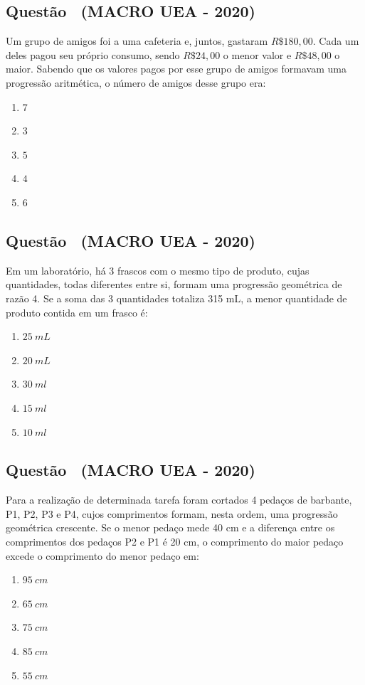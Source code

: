 \documentclass[12pt]{article}
\newcounter{questao}
\newcommand{\novaquestao}[1]{%
  \stepcounter{questao}%
  \subsection*{Questão \thequestao\ (#1)}%
}
\begin{document}
\begin{multicols}{2}
        \novaquestao{MACRO UEA - 2020}
            Um grupo de amigos foi a uma cafeteria e, juntos, gastaram $R\$ 180,00$. Cada um deles pagou seu próprio consumo, sendo $R\$ 24,00$ o menor valor e $R\$ 48,00$ o maior. Sabendo que os valores pagos por esse grupo de amigos formavam uma progressão aritmética, o número de amigos desse grupo era:        
        
            \begin{enumerate}[label=(\alph*), noitemsep]
                \item $7$
                \item $3$
                \item $5$
                \item $4$
                \item $6$
            \end{enumerate}
        
        \novaquestao{MACRO UEA - 2020}
            Em um laboratório, há 3 frascos com o mesmo tipo de produto, cujas quantidades, todas diferentes entre si, formam uma progressão geométrica de razão 4. Se a soma das 3 quantidades totaliza 315 mL, a menor quantidade de produto contida em um frasco é:
        
            \begin{enumerate}[label=(\alph*), noitemsep]
                \item $25\ mL$
                \item $20\ mL$
                \item $30\ ml$
                \item $15\ ml$
                \item $10\ ml$
            \end{enumerate}

        \novaquestao{MACRO UEA - 2020}
        
            Para a realização de determinada tarefa foram cortados 4 pedaços de barbante, P1, P2, P3 e P4, cujos comprimentos formam, nesta ordem, uma progressão geométrica crescente. Se o menor pedaço mede 40 cm e a diferença entre os comprimentos dos pedaços P2 e P1 é 20 cm, o comprimento do maior pedaço excede o comprimento do menor pedaço em:

            \begin{enumerate}[label=(\alph*), noitemsep]
                \item $95\ cm$
                \item $65\ cm$
                \item $75\ cm$
                \item $85\ cm$
                \item $55\ cm$
            \end{enumerate}


\end{multicols}
\end{document}
